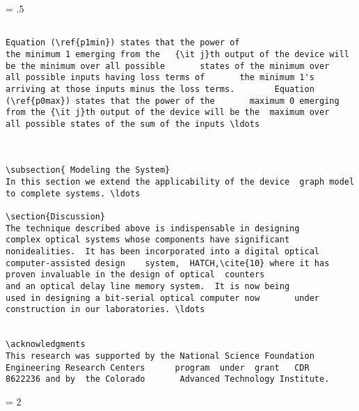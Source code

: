 \newpage
\baselineskip = .5\baselineskip  %
\begin{verbatim}

Equation (\ref{p1min}) states that the power of
the minimum 1 emerging from the   {\it j}th output of the device will
be the minimum over all possible       states of the minimum over
all possible inputs having loss terms of       the minimum 1's
arriving at those inputs minus the loss terms.        Equation
(\ref{p0max}) states that the power of the       maximum 0 emerging
from the {\it j}th output of the device will be the  maximum over
all possible states of the sum of the inputs \ldots



\subsection{ Modeling the System}
In this section we extend the applicability of the device  graph model
to complete systems. \ldots

\section{Discussion}
The technique described above is indispensable in designing
complex optical systems whose components have significant
nonidealities.  It has been incorporated into a digital optical
computer-assisted design    system,  HATCH,\cite{10} where it has
proven invaluable in the design of optical  counters
and an optical delay line memory system.  It is now being
used in designing a bit-serial optical computer now       under
construction in our laboratories. \ldots


\acknowledgments
This research was supported by the National Science Foundation
Engineering Research Centers      program  under  grant   CDR
8622236 and by  the Colorado       Advanced Technology Institute.

\end{verbatim}
\newpage
\baselineskip = 2\baselineskip  %




